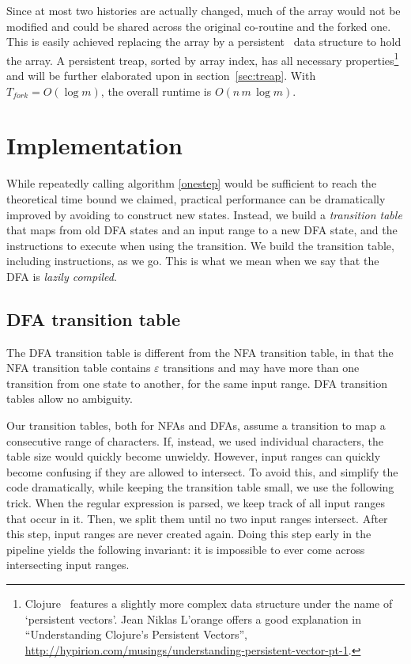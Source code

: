 \documentclass[english,twocolumn]{article}
\theoremstyle{definition}
\newcommand{\Secref}[1]{section~\ref{sec:#1}}
\begin{document}
Since at most two histories are actually changed, much of the 
array would not be modified and could be shared across the original
co-routine and the forked one. This is easily achieved replacing the
array by a persistent~\cite{Dris89a} data structure to hold the 
array. A persistent treap, sorted by array index, has all necessary properties\footnote{Clojure~\cite{Hick08} features a slightly more complex 
data structure under the name of `persistent vectors'. Jean Niklas L'orange offers
a good explanation in ``Understanding Clojure's Persistent Vectors'',
\url{http://hypirion.com/musings/understanding-persistent-vector-pt-1}.}
and will be further elaborated upon in \Secref{treap}. With
$T_{fork}=O(\log m)$, the overall runtime is $O(n\,m\,\log m)$.

\section{Implementation}
While repeatedly calling algorithm \ref{onestep} would be sufficient
to reach the theoretical time bound we claimed, practical performance
can be dramatically improved by avoiding to construct new states.
Instead, we build a \emph{transition table} that maps from old DFA
states and an input range to a new DFA state, and the instructions
to execute when using the transition. We build the transition table,
including instructions, as we go. This is what we mean when we say
that the DFA is \emph{lazily compiled}. 

\subsection{DFA transition table}
The DFA transition table is different from the NFA transition table,
in that the NFA transition table contains $\varepsilon$ transitions and
may have more than one transition from one state to another, for
the same input range. DFA transition tables allow no ambiguity.

Our transition tables, both for NFAs and DFAs, assume a transition
to map a consecutive range of characters. If, instead, we used
individual characters, the table size would quickly become unwieldy.
However, input ranges can quickly become confusing if they are
allowed to intersect. To avoid this, and simplify the code dramatically,
while keeping the transition table small, we use the following
trick. When the regular expression is parsed, we keep track of all
input ranges that occur in it. Then, we split them until no two
input ranges intersect.  After this step, input ranges are never
created again.  Doing this step early in the pipeline yields the
following invariant: it is impossible to ever come across intersecting
input ranges.
\end{document}
